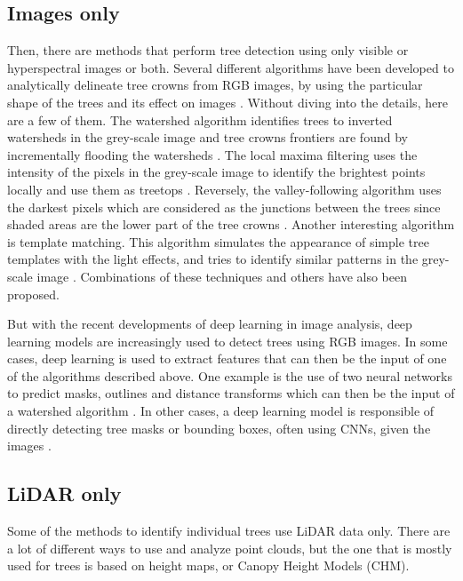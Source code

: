 \documentclass[
]{report}
\begin{document}
\subsection{Images only}\label{images-only}

Then, there are methods that perform tree detection using only visible
or hyperspectral images or both. Several different algorithms have been
developed to analytically delineate tree crowns from RGB images, by
using the particular shape of the trees and its effect on images
\autocite{rgb_analytical}. Without diving into the details, here are a
few of them. The watershed algorithm identifies trees to inverted
watersheds in the grey-scale image and tree crowns frontiers are found
by incrementally flooding the watersheds \autocite{watershed}. The local
maxima filtering uses the intensity of the pixels in the grey-scale
image to identify the brightest points locally and use them as treetops
\autocite{local-maximum}. Reversely, the valley-following algorithm uses
the darkest pixels which are considered as the junctions between the
trees since shaded areas are the lower part of the tree crowns
\autocite{valley-following}. Another interesting algorithm is template
matching. This algorithm simulates the appearance of simple tree
templates with the light effects, and tries to identify similar patterns
in the grey-scale image \autocite{template-matching}. Combinations of
these techniques and others have also been proposed.

But with the recent developments of deep learning in image analysis,
deep learning models are increasingly used to detect trees using RGB
images. In some cases, deep learning is used to extract features that
can then be the input of one of the algorithms described above. One
example is the use of two neural networks to predict masks, outlines and
distance transforms which can then be the input of a watershed algorithm
\autocite{rgb-dl-watershed}. In other cases, a deep learning model is
responsible of directly detecting tree masks or bounding boxes, often
using CNNs, given the images \autocite{DeepForest}.

\subsection{LiDAR only}\label{lidar-only}

Some of the methods to identify individual trees use LiDAR data only.
There are a lot of different ways to use and analyze point clouds, but
the one that is mostly used for trees is based on height maps, or Canopy
Height Models (CHM).
\end{document}
